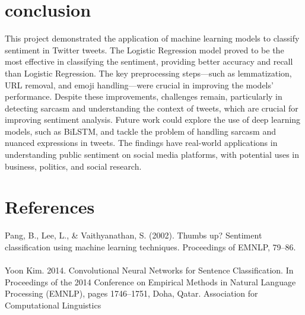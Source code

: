 \documentclass[conference]{IEEEtran}
\begin{document}
\section{conclusion}
This project demonstrated the application of machine learning models to classify sentiment in Twitter tweets. The Logistic Regression model proved to be the 
most effective in classifying the sentiment, providing better accuracy and recall than Logistic Regression. The key preprocessing steps—such as 
lemmatization, URL removal, and emoji handling—were crucial in improving the models' performance. Despite these improvements, challenges remain, 
particularly in detecting sarcasm and understanding the context of tweets, which are crucial for improving sentiment analysis. Future work could 
explore the use of deep learning models, such as BiLSTM, and tackle the problem of handling sarcasm and nuanced expressions in tweets. The findings
 have real-world applications in understanding public sentiment on social media platforms, with potential uses in business, politics, and social 
 research.
\section*{References}
Pang, B., Lee, L., & Vaithyanathan, S. (2002). Thumbs up? Sentiment classification using machine learning techniques. Proceedings of EMNLP, 79–86. 
\\
\\
Yoon Kim. 2014. Convolutional Neural Networks for Sentence Classification. In Proceedings of the 2014 Conference on Empirical Methods in Natural 
Language Processing (EMNLP), pages 1746–1751, Doha, Qatar. Association for Computational Linguistics
\vspace{12pt}
\end{document}
